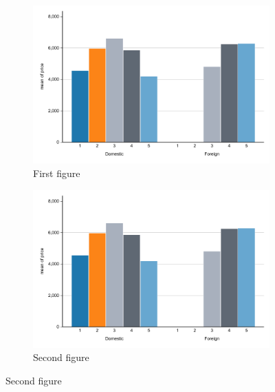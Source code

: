 \documentclass{article}%
\begin{document}

\blindtext

\begin{figure}[h]%
        \caption{Multiple figures}%
    \begin{subfigure}{0.5\textwidth}%
            \includegraphics[width=1\linewidth]{figure1.pdf}%
            \caption{First figure}%
            \label{fig:subfigure_a}%
    \end{subfigure}
    \begin{subfigure}{0.5\textwidth}%
            \includegraphics[width=.75\linewidth]{figure1.pdf}%
            \caption{Second figure}%
            \label{fig:subfigure_b}%
    \end{subfigure}
\end{figure}

\blindtext[4]
\end{document}
